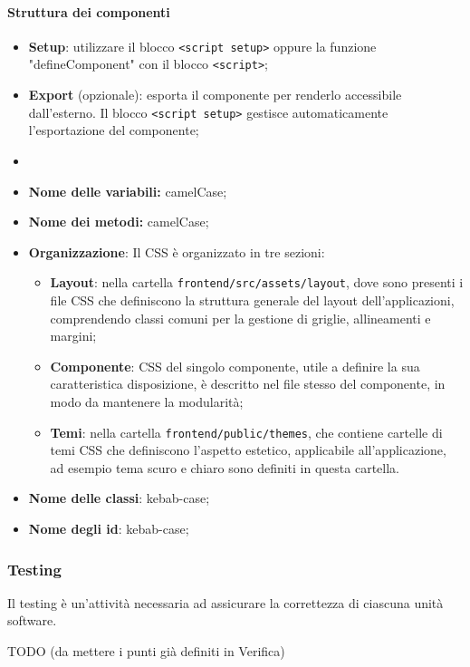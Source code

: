 \paragraph*{Struttura dei componenti}
\begin{itemize}
  \item \textbf{Setup}: utilizzare il blocco \verb|<script setup>| oppure la funzione "defineComponent" con il blocco \verb|<script>|;
  \item \textbf{Export} (opzionale): esporta il componente per renderlo accessibile dall'esterno. Il blocco \verb|<script setup>| gestisce automaticamente l'esportazione del componente;
  \item 
\end{itemize}

\begin{itemize}
  \item \textbf{Nome delle variabili:} camelCase;
  \item \textbf{Nome dei metodi:} camelCase;
\end{itemize}


\begin{itemize}
  \item \textbf{Organizzazione}: Il CSS è organizzato in tre sezioni:
  \begin{itemize}
    \item \textbf{Layout}: nella cartella \texttt{frontend/src/assets/layout}, dove sono presenti i file CSS che definiscono la struttura generale del layout dell'applicazioni, comprendendo classi comuni per la gestione di griglie, allineamenti e margini;
    \item \textbf{Componente}: CSS del singolo componente, utile a definire la sua caratteristica disposizione, è descritto nel file stesso del componente, in modo da mantenere la modularità;
    \item \textbf{Temi}: nella cartella \texttt{frontend/public/themes}, che contiene cartelle di temi CSS che definiscono l'aspetto estetico, applicabile all'applicazione, ad esempio tema scuro e chiaro sono definiti in questa cartella.
  \end{itemize}
  \item \textbf{Nome delle classi}: kebab-case;
  \item \textbf{Nome degli id}: kebab-case;
\end{itemize}

\subsubsection{Testing}\label{testing}
\par Il testing è un'attività necessaria ad assicurare la correttezza di ciascuna unità software.

\par TODO (da mettere i punti già definiti in Verifica)
